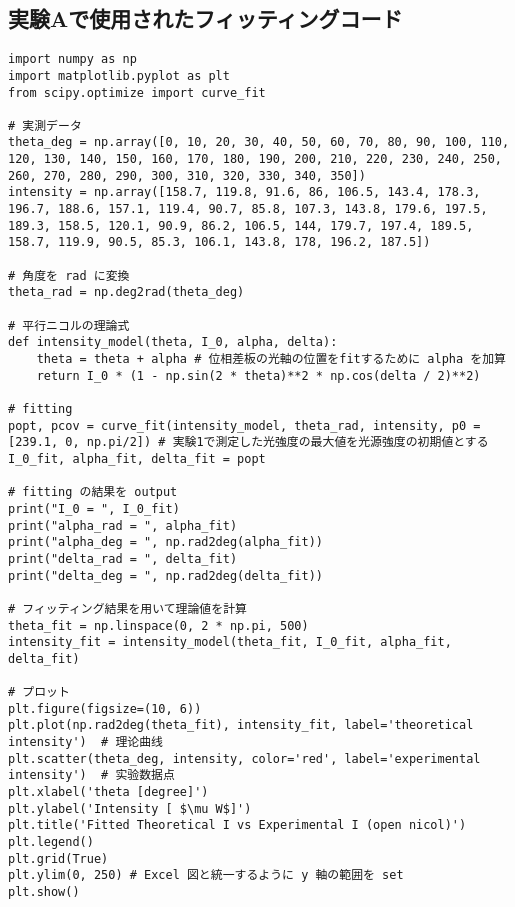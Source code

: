 \documentclass{article}
\begin{document}
\subsection*{実験Aで使用されたフィッティングコード}
\begin{lstlisting}
import numpy as np
import matplotlib.pyplot as plt
from scipy.optimize import curve_fit

# 実測データ
theta_deg = np.array([0, 10, 20, 30, 40, 50, 60, 70, 80, 90, 100, 110, 120, 130, 140, 150, 160, 170, 180, 190, 200, 210, 220, 230, 240, 250, 260, 270, 280, 290, 300, 310, 320, 330, 340, 350])
intensity = np.array([158.7, 119.8, 91.6, 86, 106.5, 143.4, 178.3, 196.7, 188.6, 157.1, 119.4, 90.7, 85.8, 107.3, 143.8, 179.6, 197.5, 189.3, 158.5, 120.1, 90.9, 86.2, 106.5, 144, 179.7, 197.4, 189.5, 158.7, 119.9, 90.5, 85.3, 106.1, 143.8, 178, 196.2, 187.5])

# 角度を rad に変換
theta_rad = np.deg2rad(theta_deg)

# 平行ニコルの理論式
def intensity_model(theta, I_0, alpha, delta):
    theta = theta + alpha # 位相差板の光軸の位置をfitするために alpha を加算
    return I_0 * (1 - np.sin(2 * theta)**2 * np.cos(delta / 2)**2)

# fitting
popt, pcov = curve_fit(intensity_model, theta_rad, intensity, p0 = [239.1, 0, np.pi/2]) # 実験1で測定した光強度の最大値を光源強度の初期値とする
I_0_fit, alpha_fit, delta_fit = popt

# fitting の結果を output
print("I_0 = ", I_0_fit)
print("alpha_rad = ", alpha_fit)
print("alpha_deg = ", np.rad2deg(alpha_fit))
print("delta_rad = ", delta_fit)
print("delta_deg = ", np.rad2deg(delta_fit))

# フィッティング結果を用いて理論値を計算
theta_fit = np.linspace(0, 2 * np.pi, 500)
intensity_fit = intensity_model(theta_fit, I_0_fit, alpha_fit, delta_fit)

# プロット
plt.figure(figsize=(10, 6))
plt.plot(np.rad2deg(theta_fit), intensity_fit, label='theoretical intensity')  # 理论曲线
plt.scatter(theta_deg, intensity, color='red', label='experimental intensity')  # 实验数据点
plt.xlabel('theta [degree]')
plt.ylabel('Intensity [ $\mu W$]')
plt.title('Fitted Theoretical I vs Experimental I (open nicol)')
plt.legend()
plt.grid(True)
plt.ylim(0, 250) # Excel 図と統一するように y 軸の範囲を set
plt.show()
\end{lstlisting}
\end{document}
